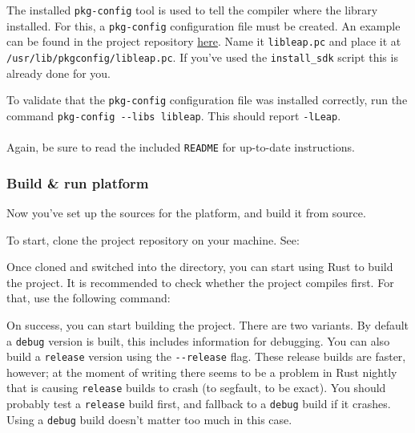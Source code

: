 \documentclass{standalone}
\begin{document}
  The installed \verb_pkg-config_ tool is used to tell the compiler where the
  library installed. For this, a \verb_pkg-config_ configuration file must be
  created. An example can be found in the project repository
  \href{https://gitlab.com/timvisee/cant-touch-this/blob/ece65fab15b3c088e57628dc0c82474efddbbfd2/ci/libleap.pc}{here}.
  Name it \verb_libleap.pc_ and place it at
  \verb_/usr/lib/pkgconfig/libleap.pc_. If you've used the \verb`install_sdk`
  script this is already done for you.

  To validate that the \verb_pkg-config_ configuration file was installed
  correctly, run the command \verb_pkg-config --libs libleap_. This should
  report \verb_-lLeap_.

  \paragraph{}
  Again, be sure to read the included \verb_README_ for up-to-date instructions.

  \subsubsection{Build \& run platform}
  Now you've set up the sources for the platform, and build it from source.

  To start, clone the project repository on your machine. See:
  

  Once cloned and switched into the directory, you can start using Rust to build
  the project. It is recommended to check whether the project compiles first.
  For that, use the following command:

  

  On success, you can start building the project. There are two variants. By
  default a \verb_debug_ version is built, this includes information for
  debugging. You can also build a \verb_release_ version using the
  \verb_--release_ flag. These release builds are faster, however; at the
  moment of writing there seems to be a problem in Rust nightly that is causing
  \verb_release_ builds to crash (to segfault, to be exact). You should probably
  test a \verb_release_ build first, and fallback to a \verb_debug_ build if it
  crashes. Using a \verb_debug_ build doesn't matter too much in this case.
\end{document}
